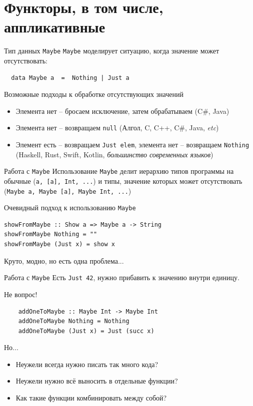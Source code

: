 \documentclass{beamer}
\begin{document}
  \section{Функторы, в том числе, аппликативные}
  \begin{frame}[fragile]{Тип данных \texttt{Maybe}}
    \texttt{Maybe} моделирует ситуацию, когда значение может отсутствовать:
    \begin{verbatim}
  data Maybe a  =  Nothing | Just a
    \end{verbatim}
    \begin{block}{Возможные подходы к обработке отсутствующих значений}
        \begin{itemize}
            \item Элемента нет -- бросаем исключение, затем обрабатываем (C\#, Java)
            \item Элемента нет -- возвращаем \texttt{null} (Алгол, C, C++, C\#, Java, \textit{etc})
            \item Элемент есть -- возвращаем \texttt{Just elem}, элемента нет -- возвращаем \texttt{Nothing} (Haskell, Rust, Swift, Kotlin, \textit{большинство современных языков})
        \end{itemize}
    \end{block}
  \end{frame}
  \begin{frame}[fragile]{Работа с \texttt{Maybe}}
      Использование \texttt{Maybe} делит иерархию типов программы на обычные (\texttt{a, [a], Int, ...}) и типы, значение которых может отсутствовать (\texttt{Maybe a, Maybe [a], Maybe Int, ...})
      
      \begin{block}{Очевидный подход к использованию \texttt{Maybe}}
\begin{verbatim}
showFromMaybe :: Show a => Maybe a -> String
showFromMaybe Nothing = ""
showFromMaybe (Just x) = show x
\end{verbatim}
      \end{block}
  Круто, модно, но есть одна проблема... 
  \end{frame}
  \begin{frame}[fragile]{Работа с \texttt{Maybe}}
      Есть \texttt{Just 42}, нужно прибавить к значению внутри единицу.
      \begin{block}{Не вопрос!}
  \begin{verbatim}
    addOneToMaybe :: Maybe Int -> Maybe Int
    addOneToMaybe Nothing = Nothing
    addOneToMaybe (Just x) = Just (succ x)
\end{verbatim}
      \end{block}
      \begin{block}{Но...}
        \begin{itemize}
            \item Неужели всегда нужно писать так много кода?
            \item Неужели нужно всё выносить в отдельные функции?
            \item Как такие функции комбинировать между собой?
        \end{itemize}
      \end{block}
  \end{frame}
\end{document}
